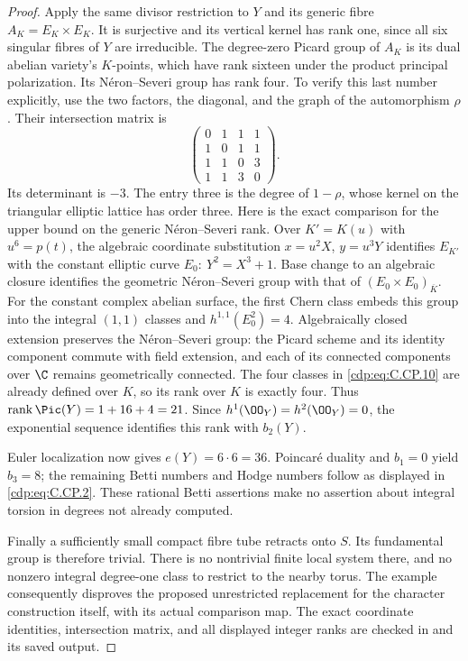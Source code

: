 \begin{proof}
Apply the same divisor restriction to $Y$ and its
generic fibre $A_K=E_K\times E_K$. It is surjective
and its vertical kernel has rank one, since all six
singular fibres of $Y$ are irreducible. The degree-zero
Picard group of $A_K$ is its dual abelian variety's
$K$-points, which have rank sixteen under the product
principal polarization. Its N\'eron--Severi group has
rank four. To verify this last number explicitly, use
the two factors, the diagonal, and the graph of the
automorphism $\rho$. Their intersection matrix is
\[
 \begin{pmatrix}
 0&1&1&1\\1&0&1&1\\1&1&0&3\\1&1&3&0
 \end{pmatrix}.                                \tag{C.CP.10}\label{cdp:eq:C.CP.10}
\]
Its determinant is $-3$. The entry three is the degree of
$1-\rho$, whose kernel on the triangular elliptic
lattice has order three. Here is the exact comparison
for the upper bound on the generic N\'eron--Severi rank.
Over $K'=K(u)$ with $u^6=p(t)$, the algebraic
coordinate substitution $x=u^2X$, $y=u^3Y$ identifies
$E_{K'}$ with the constant elliptic curve
$E_0:\ Y^2=X^3+1$. Base change to an algebraic closure
identifies the geometric N\'eron--Severi group with that
of $(E_0\times E_0)_{\overline K}$. For the constant
complex abelian surface, the first Chern class embeds
this group into the integral $(1,1)$ classes and
$h^{1,1}(E_0^2)=4$. Algebraically closed extension
preserves the N\'eron--Severi group: the Picard scheme
and its identity component commute with field extension,
and each of its connected components over $\C$ remains
geometrically connected. The four classes
in \eqref{cdp:eq:C.CP.10} are already defined over $K$, so its rank
over $K$ is exactly four. Thus
$\operatorname{rank}\Pic(Y)=1+16+4=21$.
Since $h^1(\OO_Y)=h^2(\OO_Y)=0$, the exponential
sequence identifies this rank with $b_2(Y)$.

Euler localization now gives $e(Y)=6\cdot6=36$.
Poincar\'e duality and $b_1=0$ yield $b_3=8$;
the remaining Betti numbers and Hodge numbers follow
as displayed in \eqref{cdp:eq:C.CP.2}. These rational Betti assertions
make no assertion about integral torsion in degrees
not already computed.

Finally a sufficiently small compact fibre tube retracts
onto $S$. Its fundamental group is therefore trivial.
There is no nontrivial finite local system there, and
no nonzero integral degree-one class to restrict to
the nearby torus. The example consequently disproves
the proposed unrestricted replacement for the character
construction itself, with its actual comparison map.
The exact coordinate identities, intersection matrix,
and all displayed integer ranks are checked in
 and its saved output.
\end{proof}

